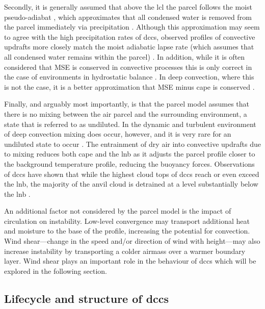 Secondly, it is generally assumed that above the \acrshort{lcl} the parcel follows the moist pseudo-adiabat \citep{peters_generalized_2022}, which approximates that all condensed water is removed from the parcel immediately via precipitation \citep{emanuel_atmospheric_1994}. 
Although this approximation may seem to agree with the high precipitation rates of \acrshort{dcc}s, observed profiles of convective updrafts more closely match the moist adiabatic lapse rate (which assumes that all condensed water remains within the parcel) \citep{xu_is_1989}. 
In addition, while it is often considered that MSE is conserved in convective processes this is only correct in the case of environments in hydrostatic balance \citep{peters_evaluating_2021}. 
In deep convection, where this is not the case, it is a better approximation that MSE minus \acrshort{cape} is conserved \citep{romps_mse_2015}.

Finally, and arguably most importantly, is that the parcel model assumes that there is no mixing between the air parcel and the surrounding environment, a state that is referred to as undiluted. 
In the dynamic and turbulent environment of deep convection mixing does occur, however, and it is very rare for an undiluted state to occur \citep{romps_undiluted_2010}. 
The entrainment of dry air into convective updrafts due to mixing reduces both \acrshort{cape} \citep{zhang_effects_2009} and the \acrshort{lnb} \citep{masunaga_convective_2016} as it adjusts the parcel profile closer to the background temperature profile, reducing the buoyancy forces. 
Observations of \acrshort{dcc}s have shown that while the highest cloud tops of \acrshort{dcc}s reach or even exceed the \acrshort{lnb}, the majority of the anvil cloud is detrained at a level substantially below the \acrshort{lnb} \citep{takahashi_where_2012, takahashi_level_2017}.

An additional factor not considered by the parcel model is the impact of circulation on instability.
Low-level convergence may transport additional heat and moisture to the base of the profile, increasing the potential for convection.
Wind shear---change in the speed and/or direction of wind with height---may also increase instability by transporting a colder airmass over a warmer boundary layer.
Wind shear plays an important role in the behaviour of \acrshort{dcc}s which will be explored in the following section.

\subsection{Lifecycle and structure of \acrshort{dcc}s}

